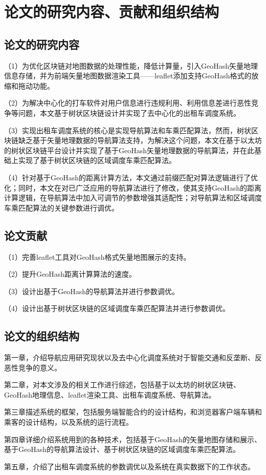 \section{论文的研究内容、贡献和组织结构}
\subsection{论文的研究内容}
（1）为优化区块链对地图数据的处理性能，降低计算量，引入GeoHash矢量地理信息存储，并为前端矢量地图数据渲染工具——leaflet添加支持GeoHash格式的放缩和拖动功能。\par
（2）为解决中心化的打车软件对用户信息进行违规利用、利用信息差进行恶性竞争等问题，本文基于树状区块链设计并实现了去中心化的出租车调度系统。\par
（3）实现出租车调度系统的核心是实现导航算法和车乘匹配算法，然而，树状区块链缺乏基于矢量地理数据的导航算法支持，为解决这个问题，本文在基于以太坊的树状区块链平台设计并实现了基于GeoHash矢量地理数据的导航算法，并在此基础上实现了基于树状区块链的区域调度车乘匹配算法。\par
（4）针对基于GeoHash的距离计算方法，本文通过前缀匹配对算法逻辑进行了优化；同时，本文在对已广泛应用的导航算法进行了修改，使其支持GeoHash的距离计算逻辑，在导航算法中加入可调节的参数增强其适配性；对导航算法和区域调度车乘匹配算法的关键参数进行调优。
\subsection{论文贡献}
（1）完善leaflet工具对GeoHash格式矢量地图展示的支持。\par
（2）提升GeoHash距离计算算法的速度。\par
（3）设计出基于GeoHash的导航算法并进行参数调优。\par
（4）设计出基于树状区块链的区域调度车乘匹配算法并进行参数调优。
\subsection{论文的组织结构}
第一章，介绍导航应用研究现状以及去中心化调度系统对于智能交通和反垄断、反恶性竞争的意义。\par
第二章，对本文涉及的相关工作进行综述，包括基于以太坊的树状区块链、GeoHash地理信息、leaflet渲染工具、出租车调度系统、导航算法。\par
第三章描述系统的框架，包括服务端智能合约的设计结构，和浏览器客户端车辆和乘客的设计结构，以及系统的运行流程。\par
第四章详细介绍系统用到的各种技术，包括基于GeoHash的矢量地图存储和展示、基于GeoHash的导航算法设计、基于树状区块链的区域调度车乘匹配算法。\par
第五章，介绍了出租车调度系统的参数调优以及系统在真实数据下的工作状态。